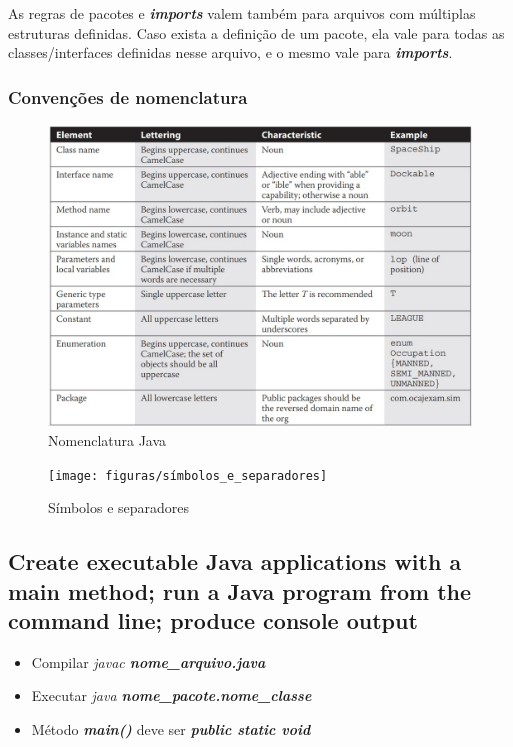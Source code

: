 \documentclass[12pt]{article}
\begin{document}
As regras de pacotes e \textbf{\textit{imports}} valem também para arquivos com múltiplas estruturas definidas. Caso exista a definição de um pacote, ela vale para todas as classes/interfaces definidas nesse arquivo, e o mesmo vale para \textbf{\textit{imports}}.

\subsubsection{Convenções de nomenclatura}

\begin{figure}[H]
	\centering
	\includegraphics[width=1\linewidth]{figuras/nomenclatura}
	\caption[Nomenclatura Java]{Nomenclatura Java}
	\label{fig:nomenclatura}
\end{figure}

\begin{figure}[H]
	\centering
	\texttt{[image: figuras/símbolos\_e\_separadores]}
	\caption[Símbolos e separadores]{Símbolos e separadores}
	\label{fig:simboloseseparadores}
\end{figure}


\subsection{Create executable Java applications with a main method; run a Java program from the command line; produce console output}

\begin{itemize}
	\item Compilar \textit{javac \textbf{nome\_arquivo.java}}
	\item Executar \textit{java \textbf{nome\_pacote.nome\_classe}}
	\item Método \textit{\textbf{main()}} deve ser \textit{\textbf{public static void}}
\end{itemize}
\end{document}
